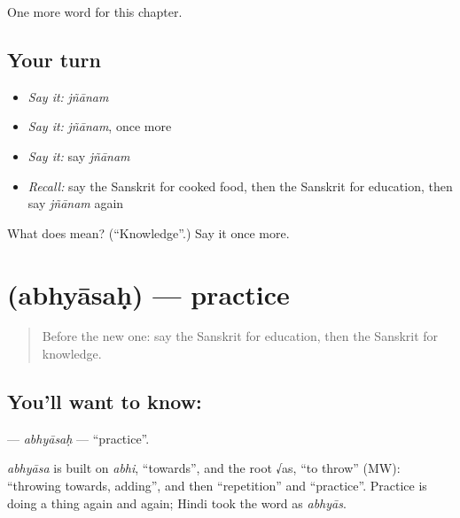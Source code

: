 \begin{grammarlens}[title={What you've built}]
One more word for this chapter.
\end{grammarlens}

\subsection*{Your turn}
\begin{itemize}
\raggedright
  \item \emph{Say it:} \emph{jñānam}
  \item \emph{Say it:} \emph{jñānam}, once more
  \item \emph{Say it:} say \emph{jñānam}
  \item \emph{Recall:} say the Sanskrit for cooked food, then the Sanskrit for education, then say \emph{jñānam} again
\end{itemize}

\begin{tcolorbox}[breakable,colback=teal!4,colframe=teal!35!black,title={Before you move on}]
What does  mean? (\textquotedblleft{}Knowledge\textquotedblright{}.) Say it once more.
\end{tcolorbox}
\section[\texorpdfstring{\sk{अभ्यासः} (abhyāsaḥ)}{अभ्यासः (abhyāsaḥ)}]{ (abhyāsaḥ) — practice}

\label{lesson:SA-C255-abhyasah}



\begin{quote}
Before the new one: say the Sanskrit for education, then the Sanskrit for knowledge.
\end{quote}

\subsection*{You'll want to know: }
\textbf{} — \emph{abhyāsaḥ} — \textquotedblleft{}practice\textquotedblright{}.

\begin{cousinweb}
\emph{abhyāsa} is built on \emph{abhi}, \textquotedblleft{}towards\textquotedblright{}, and the root √as, \textquotedblleft{}to throw\textquotedblright{} (MW): \textquotedblleft{}throwing towards, adding\textquotedblright{}, and then \textquotedblleft{}repetition\textquotedblright{} and \textquotedblleft{}practice\textquotedblright{}. Practice is doing a thing again and again; Hindi took the word as \emph{abhyās}.
\end{cousinweb}

